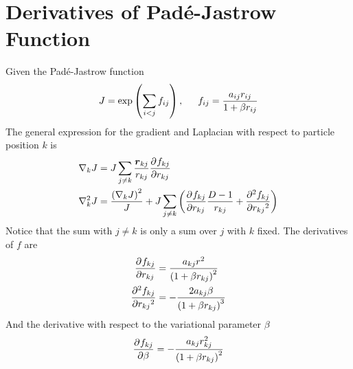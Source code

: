\section{Derivatives of Pad\'e-Jastrow Function}
    Given the Pad\'e-Jastrow function
        \begin{equation}
            J = \exp\left(\sum\limits_{i<j}f_{ij}\right) ,\indent f_{ij} =
            \frac{a_{ij}r_{ij}}{1 + \beta r_{ij}}
        \end{equation}
    The general expression for the gradient and Laplacian with respect to
    particle position $k$ is
        \begin{equation}
            \begin{aligned}
                \nabla_k J &= J\sum_{j\neq k} \frac{\blds{r}_{kj}}{r_{kj}}
                \prd{r_{kj}}[f_{kj}] \\
                \nabla^2_k J &= \frac{\left(\nabla_k J\right)^2}{J} +
                J\sum_{j\neq k} \left(\prd{r_{kj}}[f_{kj}] \frac{D-1}{r_{kj}} +
                \prd{r_{kj}}[f_{kj}][2]\right)
            \end{aligned}
        \end{equation}
    Notice that the sum with $j\neq k$ is only a sum over $j$ with $k$ fixed.
    The derivatives of $f$ are
        \begin{equation}
            \begin{aligned}
                \prd{r_{kj}}[f_{kj}] &= \frac{a_{kj}r^2}{\left(1 + \beta
                r_{kj}\right)^2} \\
                \prd{r_{kj}}[f_{kj}][2] &= -\frac{2a_{kj}\beta}{\left(1 + \beta
                r_{kj}\right)^3}
            \end{aligned}
        \end{equation}
    And the derivative with respect to the variational parameter $\beta$
        \begin{equation}
            \prd{\beta}[f_{kj}] = -\frac{a_{kj}r^2_{kj}}{\left(1 + \beta
            r_{kj}\right)^2}
        \end{equation}

